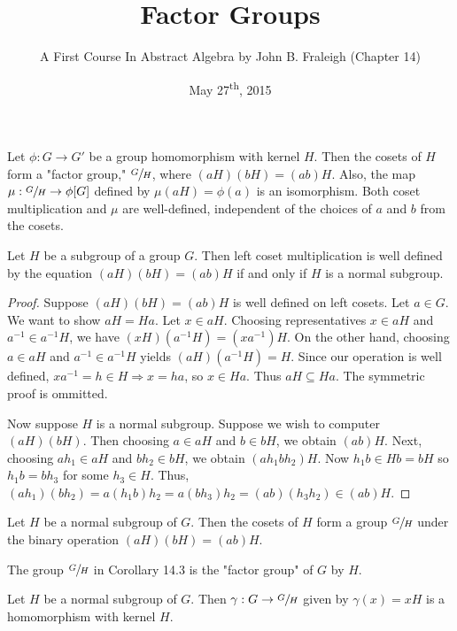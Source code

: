\documentclass[a4paper,8pt]{article}
\title{Factor Groups}
\author{A First Course In Abstract Algebra by John B. Fraleigh (Chapter 14)}
\date{May 27\textsuperscript{th}, 2015}
\begin{document}
\maketitle
{}

\begin{outline}

    Let \(\phi: G \rightarrow G'\) be a group homomorphism with kernel \(H\). Then the cosets of \(H\) form a
    "factor group," \(\sfrac{G}{H}\), where \((aH)(bH) = (ab)H\). Also, the map \(\mu: \sfrac{G}{H} \rightarrow
    \phi[G]\) defined by \(\mu(aH) = \phi(a)\) is an isomorphism. Both coset multiplication and \(\mu\) are
    well-defined, independent of the choices of \(a\) and \(b\) from the cosets.

    Let \(H\) be a subgroup of a group \(G\). Then left coset multiplication is well defined by the
    equation \((aH)(bH) = (ab)H\) if and only if \(H\) is a normal subgroup.

    \begin{proof}
      \forward
        Suppose \((aH)(bH) = (ab)H\) is well defined on left cosets. Let \(a \in G\). We want to show
        \(aH = Ha\). Let \(x \in aH\). Choosing representatives \(x \in aH\) and \(a^{-1} \in a^{-1}H\), we
        have \((xH)(a^{-1}H) = (xa^{-1})H\). On the other hand, choosing \(a \in aH\) and \(a^{-1} \in
        a^{-1}H\) yields \((aH)(a^{-1}H) = H\). Since our operation is well defined, \(xa^{-1} = h \in H
        \Rightarrow x = ha\), so \(x \in Ha\). Thus \(aH \subseteq Ha\). The symmetric proof is ommitted.

      \backward
        Now suppose \(H\) is a normal subgroup. Suppose we wish to computer \((aH)(bH)\). Then choosing
        \(a \in aH\) and \(b \in bH\), we obtain \((ab)H\). Next, choosing \(ah_{1} \in aH\) and \(bh_{2}
        \in bH\), we obtain \((ah_{1}bh_{2})H\). Now \(h_{1}b \in Hb = bH\) so \(h_{1}b = bh_{3}\) for
        some \(h_{3} \in H\). Thus, \((ah_{1})(bh_{2}) = a(h_{1}b)h_{2} = a(bh_{3})h_{2} = (ab)(h_{3}h_{2})
        \in (ab)H\).
    \end{proof}

    Let \(H\) be a normal subgroup of \(G\). Then the cosets of \(H\) form a group \(\sfrac{G}{H}\)
    under the binary operation \((aH)(bH) = (ab)H\).

    The group \(\sfrac{G}{H}\) in Corollary 14.3 is the "factor group" of \(G\) by \(H\).

    Let \(H\) be a normal subgroup of \(G\). Then \(\gamma: G \rightarrow \sfrac{G}{H}\) given by
    \(\gamma(x) = xH\) is a homomorphism with kernel \(H\).


\end{outline}
\end{document}
